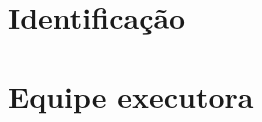 \documentclass[a4paper,11pt,openany,brazilian,version=last,draft=false]{article}
\begin{document}


\tableofcontents

\newpage%
\section{Identificação}



\newpage%
\section{Equipe executora}














\fim

\end{document}
